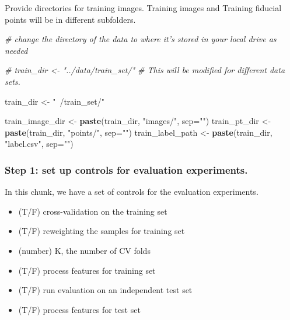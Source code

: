 \documentclass[
]{article}
\newenvironment{Shaded}{\begin{snugshade}}{\end{snugshade}}
\newcommand{\CommentTok}[1]{\textcolor[rgb]{0.56,0.35,0.01}{\textit{#1}}}
\newcommand{\DataTypeTok}[1]{\textcolor[rgb]{0.13,0.29,0.53}{#1}}
\newcommand{\KeywordTok}[1]{\textcolor[rgb]{0.13,0.29,0.53}{\textbf{#1}}}
\newcommand{\NormalTok}[1]{#1}
\newcommand{\StringTok}[1]{\textcolor[rgb]{0.31,0.60,0.02}{#1}}
\providecommand{\tightlist}{%
  \setlength{\itemsep}{0pt}\setlength{\parskip}{0pt}}
\begin{document}
Provide directories for training images. Training images and Training
fiducial points will be in different subfolders.

\begin{Shaded}
\begin{Highlighting}[]
\CommentTok{# change the directory of the data to where it's stored in your local drive as needed}

\CommentTok{# train_dir <- "../data/train_set/" # This will be modified for different data sets.}

\NormalTok{train_dir <-}\StringTok{ "~/train_set/"}


\NormalTok{train_image_dir <-}\StringTok{ }\KeywordTok{paste}\NormalTok{(train_dir, }\StringTok{"images/"}\NormalTok{, }\DataTypeTok{sep=}\StringTok{""}\NormalTok{)}
\NormalTok{train_pt_dir <-}\StringTok{ }\KeywordTok{paste}\NormalTok{(train_dir,  }\StringTok{"points/"}\NormalTok{, }\DataTypeTok{sep=}\StringTok{""}\NormalTok{)}
\NormalTok{train_label_path <-}\StringTok{ }\KeywordTok{paste}\NormalTok{(train_dir, }\StringTok{"label.csv"}\NormalTok{, }\DataTypeTok{sep=}\StringTok{""}\NormalTok{) }
\end{Highlighting}
\end{Shaded}

\hypertarget{step-1-set-up-controls-for-evaluation-experiments.}{%
\subsubsection{Step 1: set up controls for evaluation
experiments.}\label{step-1-set-up-controls-for-evaluation-experiments.}}

In this chunk, we have a set of controls for the evaluation experiments.

\begin{itemize}
\tightlist
\item
  (T/F) cross-validation on the training set
\item
  (T/F) reweighting the samples for training set
\item
  (number) K, the number of CV folds
\item
  (T/F) process features for training set
\item
  (T/F) run evaluation on an independent test set
\item
  (T/F) process features for test set
\end{itemize}
\end{document}
